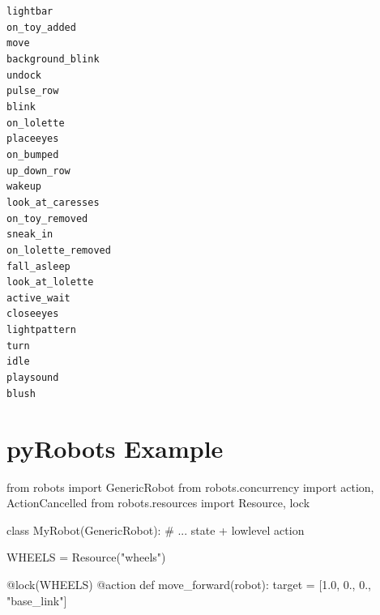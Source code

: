 \documentclass[compress]{beamer}
\begin{document}
{{{\begin{frame}{}
    \begin{multicols}{3}
\scriptsize
{\tt lightbar} \\
{\tt on\_toy\_added} \\
{\tt move} \\
{\tt background\_blink} \\
{\tt undock} \\
{\tt pulse\_row} \\
{\tt blink} \\
{\tt on\_lolette} \\
{\tt placeeyes} \\
{\tt on\_bumped} \\
{\tt up\_down\_row} \\
{\tt wakeup} \\
{\tt look\_at\_caresses} \\
{\tt on\_toy\_removed} \\
{\tt sneak\_in} \\
{\tt on\_lolette\_removed} \\
{\tt fall\_asleep} \\
{\tt look\_at\_lolette} \\
{\tt active\_wait} \\
{\tt closeeyes} \\
{\tt lightpattern} \\
{\tt turn} \\
{\tt idle} \\
{\tt playsound} \\
{\tt blush}

    \end{multicols}
\end{frame}
}

\section[pyRobots]{pyRobots Example}

\begin{frame}[fragile]
\begin{pythoncode}
    from robots import GenericRobot
    from robots.concurrency import action, ActionCancelled
    from robots.resources import Resource, lock

    class MyRobot(GenericRobot):
        # ... state + lowlevel action

    WHEELS = Resource("wheels")

    @lock(WHEELS)
    @action
    def move_forward(robot):
        target = [1.0, 0., 0., "base_link"]


\end{pythoncode}
\end{frame}}}
\end{document}
